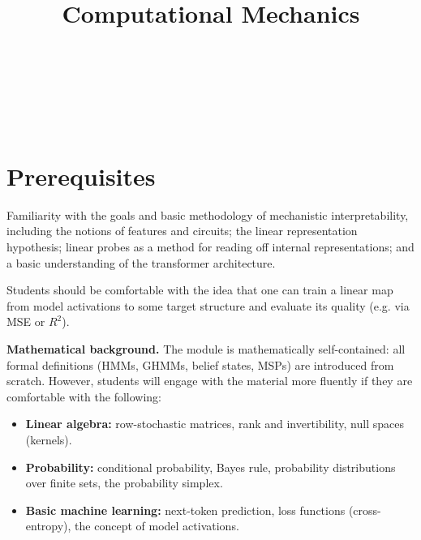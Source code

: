 \documentclass[11pt]{article}
\title{Computational Mechanics}
\author{\authorname{Xavier Poncini}\\ \affiliation{Simplex}
  \and \authorname{Adam Shai}\\ \affiliation{Simplex}
  \and \authorname{Paul Riechers}\\ \affiliation{Simplex}}
\date{}
\begin{document}
\maketitle

\section{Prerequisites}\label{prerequisites}

Familiarity with the goals and basic methodology of mechanistic interpretability, 
including the notions of features and circuits; the linear representation hypothesis; 
linear probes as a method for reading off internal representations; and a basic 
understanding of the transformer architecture. 

Students should be comfortable with the idea that one can train a linear map 
from model activations to some target structure and evaluate its 
quality (e.g. via MSE or \(R^2\)).

\textbf{Mathematical background.} The module is mathematically self-contained: 
all formal definitions (HMMs, GHMMs, belief states, MSPs) are introduced from scratch. 
However, students will engage with the material more fluently if they are comfortable with the following:

\begin{itemize}
\item
  \textbf{Linear algebra:} row-stochastic matrices, rank and invertibility, null spaces (kernels).
\item
  \textbf{Probability:} conditional probability, Bayes\textquotesingle{} rule, probability distributions over finite sets, the probability simplex.
\item
  \textbf{Basic machine learning:} next-token prediction, loss functions (cross-entropy), the concept of model activations.
\end{itemize}
\end{document}
